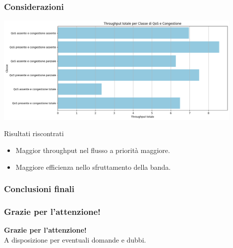 \documentclass{beamer}
\begin{document}
\begin{frame}
    \frametitle{Considerazioni}
    \centering
    \includegraphics[width=0.9\textwidth]{throughput_bar.png}
    \begin{alertblock}{Risultati riscontrati}
        \begin{itemize}
            \item Maggior throughput nel flusso a priorità maggiore.
            \item Maggiore efficienza nello sfruttamento della banda.
        \end{itemize}
    \end{alertblock}
\end{frame}

\begin{frame}
    \frametitle{Conclusioni finali}
\end{frame}

\begin{frame}
    \frametitle{Grazie per l'attenzione!}

    \begin{center}
        \textbf{Grazie per l'attenzione!} \\[1em]
        A disposizione per eventuali domande e dubbi.
    \end{center}

\end{frame}
\end{document}
